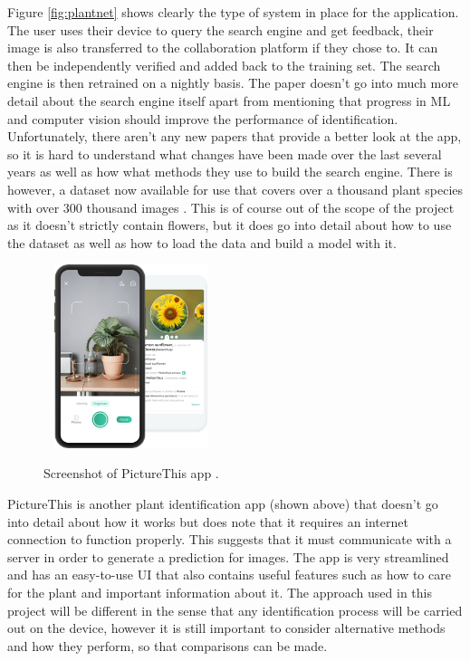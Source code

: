 \documentclass[12pt,a4paper]{report}
\begin{document}
Figure \ref{fig:plantnet} shows clearly the type of system in place for the application. The user uses their device to 
query the search
engine and get feedback, their image is also transferred to the collaboration platform if they chose to. It can then be 
independently verified and added back to the training set. The search engine is then retrained on a nightly basis. The 
paper doesn't go into much more detail about the search engine itself apart from mentioning that progress in ML 
and computer vision should improve the performance of identification. Unfortunately, there aren't any new 
papers that provide a better look at the app, so it is hard to understand what changes have been made over the last 
several years as well as how what methods they use to build the search engine. There is however, a dataset now 
available for use that covers over a thousand plant species with over 300 thousand images 
\citep{camille_garcin_2021_5645731}. This is of course out of the scope of the project as it doesn't strictly contain 
flowers, but it does go into detail about how to use the dataset as well as how to load the data and build a model with 
it.

\begin{figure}[h]\
    \centering
    \includegraphics[width=0.4\textwidth]{picturethis.png}
    \caption{Screenshot of PictureThis app \citep{picturethis}.}
\end{figure}

\break

PictureThis is another plant identification app (shown above) that doesn't go into detail about how it works but does 
note that it requires an internet connection to function properly. This suggests that it must communicate with a server 
in order to generate a prediction for images. The app is very streamlined and has an easy-to-use UI that also contains 
useful features such as how to care for the plant and important information about it. The approach used in this project
will be different in 
the sense that any identification process will be carried out on the device, however it is still important to consider 
alternative methods and how they perform, so that comparisons can be made.
\end{document}
